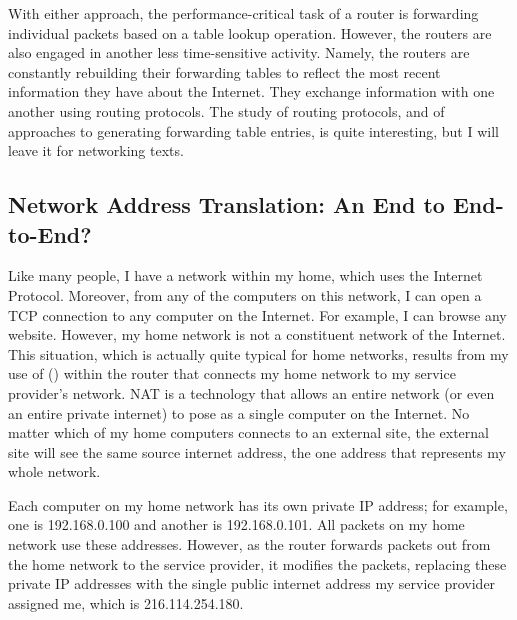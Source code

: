 With either approach, the performance-critical task of a router is
forwarding individual packets based on a table lookup operation.
However, the routers are also engaged in another less time-sensitive activity.
Namely, the
routers are constantly rebuilding their forwarding tables to reflect
the most recent information they have about the Internet.  They
exchange information with one another using routing protocols.  The
study of routing protocols, and of approaches to generating forwarding
table entries, is quite interesting, but I will leave it for networking
texts.

\subsection{Network Address Translation: An End to End-to-End?}
\label{nat-section}

Like many people, I have a network within my home, which uses the
Internet Protocol.  Moreover, from any of the computers on this
network, I can open a TCP connection to any computer on the Internet.
For example, I can browse any website.  However, my home network is not
a constituent network of the Internet.  This situation, which is actually quite typical
for home networks, results from my use of  () within the router that connects my home
network to my service provider's network.  NAT is a technology that
allows an entire network (or even an entire private internet) to pose
as a single computer on the Internet.  No matter which of my home
computers connects to an external site, the external site will see the
same source internet address, the one address that represents my whole
network.

Each computer on my home network has its own private IP address; for
example, one is 192.168.0.100 and another is 192.168.0.101.  All
packets on my home network use these addresses.  However, as the
router forwards packets out from the home network to the service
provider, it modifies the packets, replacing these private IP addresses
with the single public internet address my service provider assigned
me, which is 216.114.254.180.

